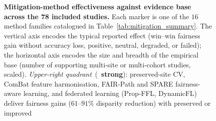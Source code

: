 \begin{figure}[!ht]
  \caption{\textbf{Mitigation-method effectiveness against evidence
           base across the 78 included studies.}  Each marker
           is one of the $16$ method families catalogued in
           Table~\ref{tab:mitigation_summary}.  The vertical axis
           encodes the typical reported effect (win--win fairness
           gain without accuracy loss, positive, neutral, degraded,
           or failed); the horizontal axis encodes the size and
           breadth of the empirical base (number of supporting
           multi-site or multi-cohort studies, scaled).
           \emph{Upper-right quadrant}~(\checkmark~\textbf{strong}):
           preserved-site CV, ComBat feature harmonisation, FAIR-Path
           and SPARE fairness-aware learning, and federated learning
           (Prop-FFL, DynamicFL) deliver fairness gains ($61$--$91\%$
           disparity reduction) with preserved or improved
}
\end{figure}
